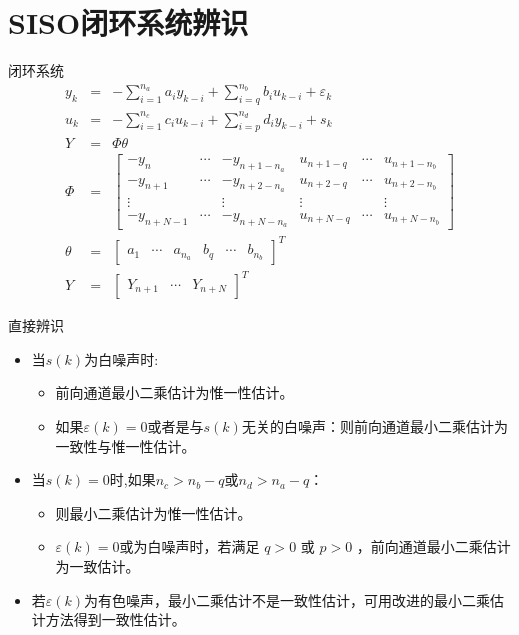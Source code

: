 \section{SISO闭环系统辨识}
\begin{frame}{闭环系统}
\begin{eqnarray*}
y_k &=& -\sum_{i=1}^{n_a} a_i y_{k-i} + \sum_{i=q}^{n_b} b_i u_{k-i} + \varepsilon_k \\
u_k &=& -\sum_{i=1}^{n_c} c_i u_{k-i} + \sum_{i=p}^{n_d} d_i y_{k-i} + s_k  \\
Y &=& \Phi\theta \\
\Phi &=& \begin{bmatrix}
-y_{n} & \cdots & -y_{n+1-n_a} & u_{n+1-q} &\cdots & u_{n+1-n_b} \\
-y_{n+1} & \cdots & -y_{n+2-n_a} & u_{n+2-q} &\cdots & u_{n+2-n_b} \\
\vdots &        &\vdots         &  \vdots  &       &\vdots \\
-y_{n+N-1} & \cdots & -y_{n+N-n_a} & u_{n+N-q} &\cdots & u_{n+N-n_b} 
\end{bmatrix} \\
\theta &=& \begin{bmatrix}a_1 & \cdots & a_{n_a} & b_q &\cdots & b_{n_b} \end{bmatrix}^T  \\
Y &=& \begin{bmatrix} Y_{n+1} & \cdots  & Y_{n+N} \end{bmatrix}^T
\end{eqnarray*}
\end{frame}

\begin{frame}{直接辨识}
\begin{itemize}
\item 当$s(k)$为白噪声时:
\begin{itemize}
\item 前向通道最小二乘估计为惟一性估计。 
\item 如果$\varepsilon(k)=0$或者是与$s(k)$无关的白噪声：则前向通道最小二乘估计为一致性与惟一性估计。
\end{itemize}
\item 当$s(k)=0$时,如果$n_c>n_b-q$或$n_d>n_a-q$：
\begin{itemize}
\item 则最小二乘估计为惟一性估计。
\item $\varepsilon(k)=0$或为白噪声时，若满足 $q>0$ 或 $p>0$ ，前向通道最小二乘估计为一致估计。
\end{itemize}
\item 若$\varepsilon(k)$为有色噪声，最小二乘估计不是一致性估计，可用改进的最小二乘估计方法得到一致性估计。
\end{itemize}
\end{frame}




